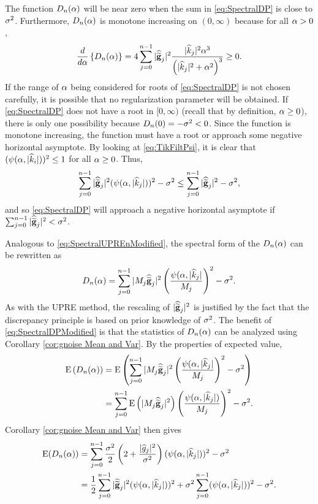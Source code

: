 The function $D_n(\alpha)$ will be near zero when the sum in \eqref{eq:SpectralDP} is close to $\sigma^2$.  Furthermore, $D_n(\alpha)$ is monotone increasing on $(0,\infty)$ because for all $\alpha > 0$,
\[\frac{d}{d\alpha}\left\{D_n(\alpha)\right\} = 4\sum_{j = 0}^{n-1} |\widehat{\widetilde{\mathbf{g}}}_j|^2\frac{|\widehat{k}_j|^2\alpha^3}{\left(|\widehat{k}_j|^2 + \alpha^2\right)^3} \geq 0.\]
If the range of $\alpha$ being considered for roots of \eqref{eq:SpectralDP} is not chosen carefully, it is possible that no regularization parameter will be obtained. If \eqref{eq:SpectralDP} does not have a root in $[0,\infty)$ (recall that by definition, $\alpha \geq 0$), there is only one possibility because $D_n(0) = -\sigma^2 < 0$. Since the function is monotone increasing, the function must have a root or approach some negative horizontal asymptote. By looking at \eqref{eq:TikFiltPsi}, it is clear that $(\psi(\alpha,|\widehat{k}_i|))^2 \leq 1$ for all $\alpha \geq 0$. Thus,
\[\sum_{j = 0}^{n-1} |\widehat{\widetilde{\mathbf{g}}}_j|^2(\psi(\alpha,|\widehat{k}_j|))^2 - \sigma^2 \leq \sum_{j = 0}^{n-1} |\widehat{\widetilde{\mathbf{g}}}_j|^2 - \sigma^2,\]
and so \eqref{eq:SpectralDP} will approach a negative horizontal asymptote if $\sum_{j = 0}^{n-1} |\widehat{\widetilde{\mathbf{g}}}_j|^2 < \sigma^2$. \par
Analogous to \eqref{eq:SpectralUPREnModified}, the spectral form of the $D_n(\alpha)$ can be rewritten as
\begin{equation}
\label{eq:SpectralDPModified}
D_n(\alpha) = \sum_{j = 0}^{n-1} |M_j\widehat{\widetilde{\mathbf{g}}}_j|^2\left(\frac{\psi(\alpha,|\widehat{k}_j|}{M_j}\right)^2 - \sigma^2.
\end{equation}
As with the UPRE method, the rescaling of $|\widehat{\widetilde{\mathbf{g}}}_j|^2$ is justified by the fact that the discrepancy principle is based on prior knowledge of $\sigma^2$. The benefit of \eqref{eq:SpectralDPModified} is that the statistics of $D_n(\alpha)$ can be analyzed using Corollary \ref{cor:gnoise Mean and Var}. By the properties of expected value,
\begin{align*}
    \operatorname{E}\left(D_n(\alpha)\right) &= \operatorname{E}\left(\sum_{j = 0}^{n-1} |M_j\widehat{\widetilde{\mathbf{g}}}_j|^2\left(\frac{\psi(\alpha,|\widehat{k}_j|}{M_j}\right)^2 - \sigma^2\right) \\
    &= \sum_{j = 0}^{n-1} \operatorname{E}\left(|M_j\widehat{\widetilde{\mathbf{g}}}_j|^2\right)\left(\frac{\psi(\alpha,|\widehat{k}_j|)}{M_j}\right)^2 - \sigma^2.
\end{align*}
Corollary \ref{cor:gnoise Mean and Var} then gives
\begin{align*}
\operatorname{E}(D_n(\alpha)) &= \sum_{j = 0}^{n-1} \frac{\sigma^2}{2}\left(2 + \frac{|\widehat{g}_j|^2}{\sigma^2}\right)(\psi(\alpha,|\widehat{k}_j|))^2 - \sigma^2 \\
&= \frac{1}{2}\sum_{j = 0}^{n-1} |\widehat{\widetilde{\mathbf{g}}}_j|^2(\psi(\alpha,|\widehat{k}_j|))^2 + \sigma^2\sum_{j = 0}^{n-1} (\psi(\alpha,|\widehat{k}_j|))^2 - \sigma^2.
\end{align*}
